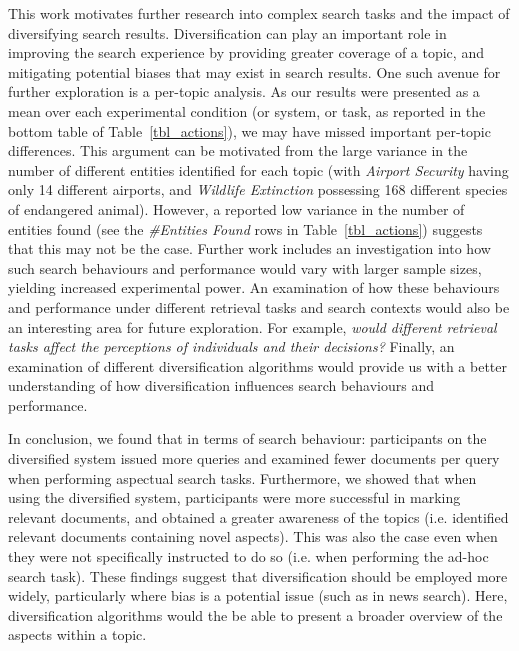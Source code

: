 This work motivates further research into complex search tasks and the impact of diversifying search results. Diversification can play an important role in improving the search experience by providing greater coverage of a topic, and mitigating potential biases that may exist in search results. One such avenue for further exploration is a per-topic analysis. As our results were presented as a mean over each experimental condition (or system, or task, as reported in the bottom table of Table~\ref{tbl_actions}), we may have missed important per-topic differences. This argument can be motivated from the large variance in the number of different entities identified for each topic (with \emph{Airport Security} having only 14 different airports, and \emph{Wildlife Extinction} possessing 168 different species of endangered animal). However, a reported low variance in the number of entities found (see the \emph{\#Entities Found} rows in Table~\ref{tbl_actions}) suggests that this may not be the case. Further work includes an investigation into how such search behaviours and performance would vary with larger sample sizes, yielding increased experimental power. An examination of how these behaviours and performance under different retrieval tasks and search contexts would also be an interesting area for future exploration. For example, \emph{would different retrieval tasks affect the perceptions of individuals and their decisions?} Finally, an examination of different diversification algorithms would provide us with a better understanding of how diversification influences search behaviours and performance.

In conclusion, we found that in terms of search behaviour: participants on the diversified system issued more queries and examined fewer documents per query when performing aspectual search tasks. Furthermore, we showed that when using the diversified system, participants were more successful in marking relevant documents, and obtained a greater awareness of the topics (i.e. identified relevant documents containing novel aspects). This was also the case even when they were not specifically instructed to do so (i.e. when performing the ad-hoc search task). These findings suggest that diversification should be employed more widely, particularly where bias is a potential issue (such as in news search). Here, diversification algorithms would the be able to present a broader overview of the aspects within a topic.   





